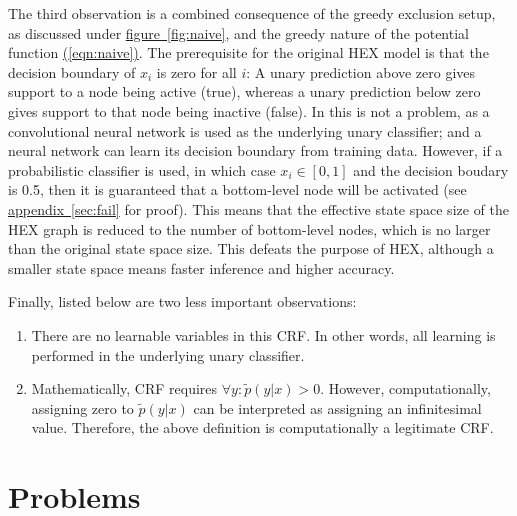 \documentclass[11pt,a4paper]{book}
\begin{document}
The third observation is a combined consequence of the greedy exclusion setup, as discussed under \hyperref[fig:naive]{figure~\ref{fig:naive}}, and the greedy nature of the potential function \hyperref[eqn:naive]{(\ref{eqn:naive})}. The prerequisite for the original HEX model is that the decision boundary of $x_i$ is zero for all $i$: A unary prediction above zero gives support to a node being active (true), whereas a unary prediction below zero gives support to that node being inactive (false). In \cite{deng2014large} this is not a problem, as a convolutional neural network \cite{krizhevsky2012imagenet} is used as the underlying unary classifier; and a neural network can learn its decision boundary from training data. However, if a probabilistic classifier is used, in which case $x_i\in[0,1]$ and the decision boudary is 0.5, then it is guaranteed that a bottom-level node will be activated (see \hyperref[sec:fail]{appendix~\ref{sec:fail}} for proof). This means that the effective state space size of the HEX graph is reduced to the number of bottom-level nodes, which is no larger than the original state space size. This defeats the purpose of HEX, although a smaller state space means faster inference and higher accuracy.

Finally, listed below are two less important observations:
\begin{enumerate}
\item There are no learnable variables in this CRF. In other words, all learning is performed in the underlying unary classifier.
\item Mathematically, CRF requires $\forall y:\tilde{p}(y|x)>0$. However, computationally, assigning zero to $\tilde{p}(y|x)$ can be interpreted as assigning an infinitesimal value. Therefore, the above definition is computationally a legitimate CRF.
\end{enumerate}

\section{Problems}
\label{sec:problem}
\end{document}
